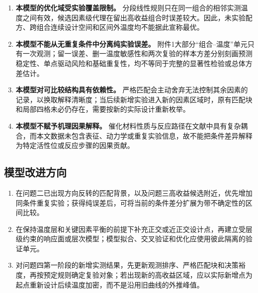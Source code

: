 \begin{enumerate}
  \item \textbf{本模型的优化域受实验覆盖限制。} 分段线性规则只在同一组合的相邻实测温度之间有效，候选因素级代理在留出高收益组合时误差较大。因此，未实验配方、跨组合连续设计空间和区间外温度均不能据此宣称最优。
  \item \textbf{本模型不能从无重复条件中分离纯实验误差。} 附件1大部分“组合--温度”单元只有一次观测；留一误差、删一温度敏感性和两次复验的样本方差分别刻画预测稳定性、单点驱动风险和基础重复性，均不等同于完整的显著性检验或总体方差估计。
  \item \textbf{本模型对可比较结构具有依赖性。} 严格匹配会主动舍弃无法控制其余因素的记录，以换取解释清晰度；当后续新增实验进入新的因素区域时，原有匹配块和局部四格未必仍存在，需要按新的实际设计重新枚举。
  \item \textbf{本模型不赋予机理因果解释。} 催化材料性质与反应路径在文献中具有复杂耦合\cite{pomalaza2016,hanspal2017,cimino2018}，而本文数据未包含表征、动力学或重复实验信息，故不能把条件差异解释为特定活性位或反应步骤的因果贡献。
\end{enumerate}

\subsection{模型改进方向}

\begin{enumerate}
  \item 在问题二已出现方向反转的匹配背景，以及问题三高收益候选附近，优先增加同条件重复实验；获得纯误差后，可将当前的条件差分扩展为带不确定性的区间比较。
  \item 在保持温度层和关键因素平衡的前提下补充正交或近正交设计点，再建立受层级约束的响应面或层次模型；模型拟合、交叉验证和优化应使用彼此隔离的验证单元。
  \item 对问题四第一阶段的新增实测结果，先更新观测排序、严格匹配块和决策裕度，再按预定规则确定复验对象；若出现新的高收益区域，应以实际新增点为起点重新设计后续温度加密，而不是沿用旧曲线的外推峰值。
\end{enumerate}
